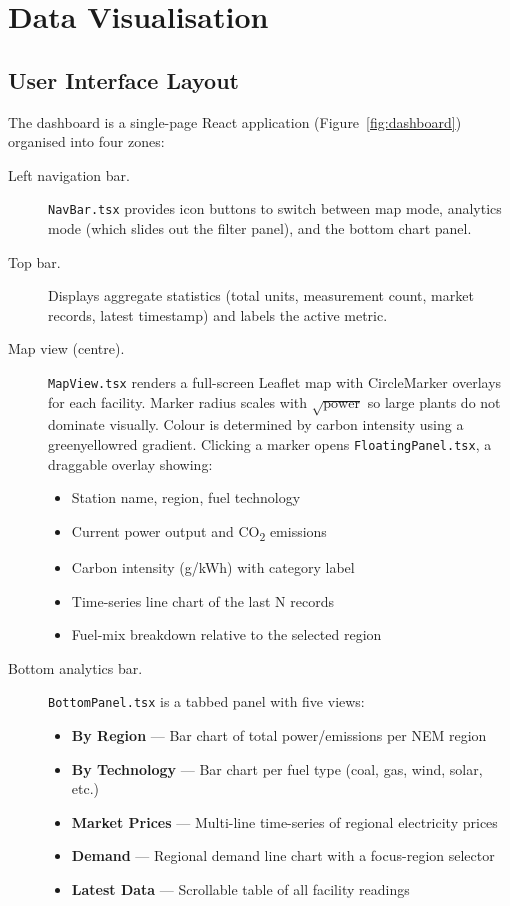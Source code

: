 \documentclass[11pt,a4paper]{article}
\begin{document}
\section{Data Visualisation}

\subsection{User Interface Layout}

The dashboard is a single-page React application (Figure~\ref{fig:dashboard}) organised into four zones:

\begin{description}
    \item[Left navigation bar.] \texttt{NavBar.tsx} provides icon buttons to switch between map mode, analytics mode (which slides out the filter panel), and the bottom chart panel.
    \item[Top bar.] Displays aggregate statistics (total units, measurement count, market records, latest timestamp) and labels the active metric.
    \item[Map view (centre).] \texttt{MapView.tsx} renders a full-screen Leaflet map with CircleMarker overlays for each facility. Marker radius scales with $\sqrt{\text{power}}$ so large plants do not dominate visually. Colour is determined by carbon intensity using a green\textrightarrow yellow\textrightarrow red gradient. Clicking a marker opens \texttt{FloatingPanel.tsx}, a draggable overlay showing:
    \begin{itemize}
        \item Station name, region, fuel technology
        \item Current power output and CO\textsubscript{2} emissions
        \item Carbon intensity (g/kWh) with category label
        \item Time-series line chart of the last N records
        \item Fuel-mix breakdown relative to the selected region
    \end{itemize}
    \item[Bottom analytics bar.] \texttt{BottomPanel.tsx} is a tabbed panel with five views:
    \begin{itemize}
        \item \textbf{By Region} --- Bar chart of total power/emissions per NEM region
        \item \textbf{By Technology} --- Bar chart per fuel type (coal, gas, wind, solar, etc.)
        \item \textbf{Market Prices} --- Multi-line time-series of regional electricity prices
        \item \textbf{Demand} --- Regional demand line chart with a focus-region selector
        \item \textbf{Latest Data} --- Scrollable table of all facility readings
    \end{itemize}
\end{description}
\end{document}
